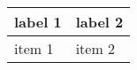 \documentclass[12pt]{article}
\begin{document}
\begin{tabularx}{\textwidth}{ |X|X| }
  \hline
  label 1 & label 2 \\
  \hline
  item 1  & item 2  \\
  \hline
\end{tabularx}
\end{document}
